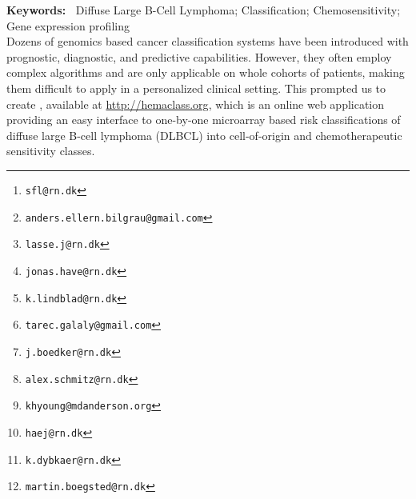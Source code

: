 

\title{\hemaClassTitle{}}

\author[1]{\small Steffen Falgreen\thanks{\texttt{sfl@rn.dk}}}
\author[12]{Anders Ellern Bilgrau\thanks{\texttt{anders.ellern.bilgrau@gmail.com}}}
\author[12]{Lasse Hjort Jakobsen\thanks{\texttt{lasse.j@rn.dk}}}
\author[12]{Jonas Have\thanks{\texttt{jonas.have@rn.dk}}}
\author[12]{Kasper Lindblad Nielsen\thanks{\texttt{k.lindblad@rn.dk}}}
\author[1]{Tarec Christoffer El-Galaly\thanks{\texttt{tarec.galaly@gmail.com}}}
\author[1]{Julie St{\o}ve  B{\o}dker\thanks{\texttt{j.boedker@rn.dk}}}
\author[1]{Alexander Schmitz\thanks{\texttt{alex.schmitz@rn.dk}}}
\author[3]{Ken H. Young\thanks{\texttt{khyoung@mdanderson.org}}}
\author[12]{Hans Erik Johnsen\thanks{\texttt{haej@rn.dk}}}
\author[12]{Karen Dybk{\ae}r\thanks{\texttt{k.dybkaer@rn.dk}}}
\author[12]{Martin B{\o}gsted\thanks{\texttt{martin.boegsted@rn.dk}}}

\date{\small \today}




\maketitle
\textbf{Keywords:~}
Diffuse Large B-Cell Lymphoma; Classification; Chemosensitivity; Gene expression profiling \\

Dozens of genomics based cancer classification systems have been introduced with prognostic, diagnostic, and predictive capabilities.
However, they often employ complex algorithms and are only applicable on whole cohorts of patients, making them difficult to apply in a personalized clinical setting. This prompted us to create \hemaClass{}, available at \url{http://hemaclass.org}, which is an online web application providing an easy interface to one-by-one microarray based risk classifications of diffuse large B-cell lymphoma (DLBCL) into cell-of-origin and chemotherapeutic sensitivity classes.

